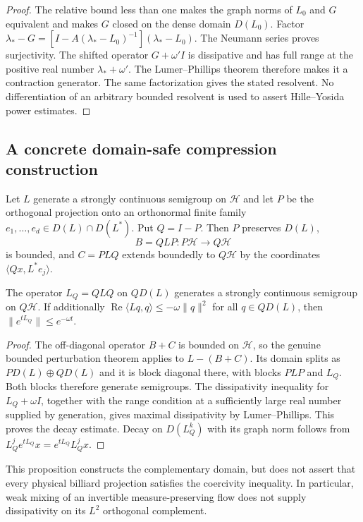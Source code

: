 \begin{proof}
The relative bound less than one makes the graph norms of $L_0$ and $G$ equivalent and makes $G$ closed on the dense domain $D(L_0)$. Factor
$\lambda_*-G=[I-A(\lambda_*-L_0)^{-1}](\lambda_*-L_0)$. The Neumann series proves surjectivity. The shifted operator $G+\omega'I$ is dissipative and has full range at the positive real number $\lambda_*+\omega'$. The Lumer--Phillips theorem therefore makes it a contraction generator. The same factorization gives the stated resolvent. No differentiation of an arbitrary bounded resolvent is used to assert Hille--Yosida power estimates.
\end{proof}

\subsection{A concrete domain-safe compression construction}
Let $L$ generate a strongly continuous semigroup on $\mathcal H$ and let $P$ be the orthogonal projection onto an orthonormal finite family $e_1,\ldots,e_d\in D(L)\cap D(L^*)$. Put $Q=I-P$. Then $P$ preserves $D(L)$,
\[
 B=QLP:P\mathcal H\to Q\mathcal H
\]
is bounded, and $C=PLQ$ extends boundedly to $Q\mathcal H$ by the coordinates $\langle Qx,L^*e_j\rangle$.

\begin{proposition}
\label{prop:r33-a4-compression}
The operator $L_Q=QLQ$ on $QD(L)$ generates a strongly continuous semigroup on $Q\mathcal H$. If additionally
$\operatorname{Re}\langle Lq,q\rangle\le-\omega\|q\|^2$ for all $q\in QD(L)$, then $\|e^{tL_Q}\|\le e^{-\omega t}$.
\end{proposition}

\begin{proof}
The off-diagonal operator $B+C$ is bounded on $\mathcal H$, so the genuine bounded perturbation theorem applies to $L-(B+C)$. Its domain splits as $PD(L)\oplus QD(L)$ and it is block diagonal there, with blocks $PLP$ and $L_Q$. Both blocks therefore generate semigroups. The dissipativity inequality for $L_Q+\omega I$, together with the range condition at a sufficiently large real number supplied by generation, gives maximal dissipativity by Lumer--Phillips. This proves the decay estimate. Decay on $D(L_Q^k)$ with its graph norm follows from $L_Q^je^{tL_Q}x=e^{tL_Q}L_Q^jx$.
\end{proof}

This proposition constructs the complementary domain, but does not assert that every physical billiard projection satisfies the coercivity inequality. In particular, weak mixing of an invertible measure-preserving flow does not supply dissipativity on its $L^2$ orthogonal complement.


